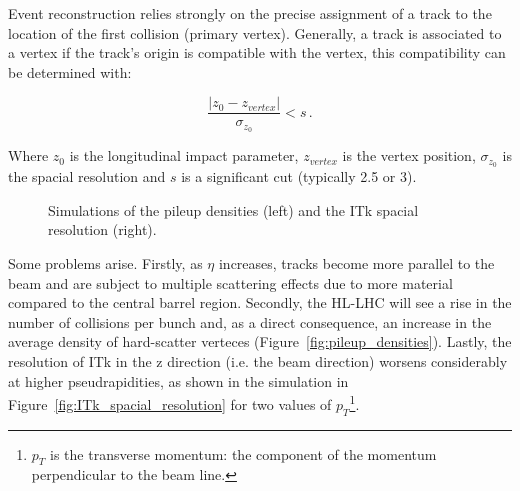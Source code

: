Event reconstruction relies strongly on the precise assignment of a track to the location of the first collision (primary vertex).%
Generally, a track is associated to a vertex if the track's origin is compatible with the vertex, this compatibility can be determined with:

\begin{equation}\label{eq:compatibility_vertex}
    \frac{\left|z_0 - z_{vertex}\right|}{\sigma_{z_0}} < s \,.
\end{equation}
 
Where $z_0$ is the longitudinal impact parameter, $z_{vertex}$ is the vertex position, $\sigma_{z_0}$ is the spacial resolution and $s$ is a significant cut (typically 2.5 or 3)\cite{cernTechnicalDesign}. 

\begin{figure}[!ht]
    \centering
    \hfill
    \centering
    \caption{Simulations of the pileup densities (left) and the ITk spacial resolution (right).}
\end{figure}

Some problems arise. 
Firstly, as $\eta$ increases, tracks become more parallel to the beam and are subject to multiple scattering effects due to more material compared to the central barrel region. Secondly, the HL-LHC will see a rise in the number of collisions per bunch%
 and, as a direct consequence, an increase in the average density of hard-scatter verteces (Figure~\ref{fig:pileup_densities}). Lastly, the resolution of ITk in the z direction (i.e. the beam direction) worsens considerably at higher pseudrapidities, as shown in the simulation in Figure~\ref{fig:ITk_spacial_resolution} for two values of $p_T$\footnote{$p_T$ is the transverse momentum: the component of the momentum perpendicular to the beam line.}.


